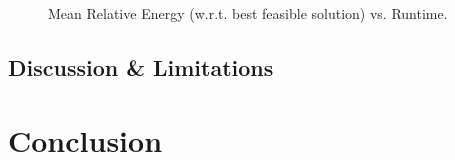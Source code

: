 \documentclass[preprint,12pt]{elsarticle}
\begin{document}
\begin{figure}[t!]%
	
	\quad
	\\%
	\caption{Mean Relative Energy (w.r.t. best feasible solution) vs. Runtime.}%
	
	\label{fig:main_effects}%
\end{figure}

\subsection{Discussion \& Limitations}



\section{Conclusion}
\label{sec:conclusion}


%

\end{document}
